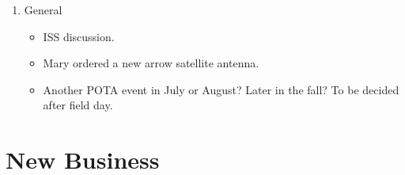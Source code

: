 \documentclass[12pt, letterpaper]{article}
\begin{document}
\begin{enumerate}
\begin{itemize}
\begin{itemize}
            \end{itemize}
        \end{itemize}
    \item General
        \begin{itemize}
            \item ISS discussion.
            \item Mary ordered a new arrow satellite antenna.
            \item Another POTA event in July or August? Later in the fall? To be decided after field day.
        \end{itemize}
    \end{enumerate}

\section{New Business}
\end{document}
